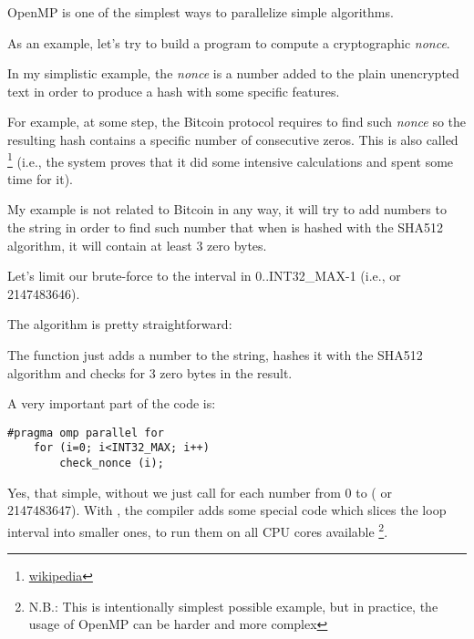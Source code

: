 \label{openmp}

OpenMP is one of the simplest ways to parallelize simple algorithms.


As an example, let's try to build a program to compute a cryptographic \emph{nonce}.

In my simplistic example, 
the \emph{nonce} is a number added to the plain unencrypted text in order to produce a hash with some specific 
features.

For example, at some step, the Bitcoin protocol requires to find such \emph{nonce} so the resulting hash
contains a specific number of consecutive zeros.
This is also called 
\footnote{\href{http://go.yurichev.com/17101}{wikipedia}} 
(i.e., the system proves that it did some intensive calculations and spent some time for it).

My example is not related to Bitcoin in any way, 
it will try to add numbers to the 
string in order to find such number that when 
 is hashed with the SHA512 algorithm, it will contain at least 3 zero bytes.

Let's limit our brute-force to the interval in
0..INT32\_MAX-1 (i.e.,  or 2147483646).

The algorithm is pretty straightforward:



The  function just adds a number to the string, 
hashes it with the SHA512 algorithm and checks for 3 zero bytes in the result.

A very important part of the code is:

\begin{lstlisting}[style=customc]
	#pragma omp parallel for
	for (i=0; i<INT32_MAX; i++)
		check_nonce (i);
\end{lstlisting}

Yes, that simple, without  
we just call  for each number from 0 to 
 ( or 2147483647).
With , the compiler adds some special 
code which slices the loop interval into smaller ones,
to run them on all \ac{CPU} cores available
\footnote{N.B.: This is intentionally simplest possible
example, but in practice, the usage of OpenMP can be harder and more complex}.

